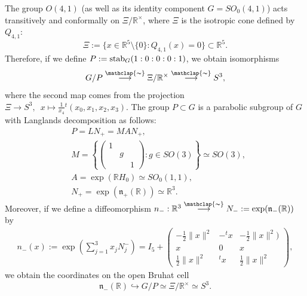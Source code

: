 \documentclass[12pt, pdflatex, a4paper]{article}
\theoremstyle{plain}
\theoremstyle{definition}
\def\n{\mathfrak{n}}
\def\R{{\mathbb R}}
\def\stab{\text{\normalfont{stab}}}
\newcommand\arrowsimeq{\stackrel{\mathclap{\thicksim}}{\longrightarrow}}
\begin{document}
The group $O(4,1)$ (as well as its identity component $G = SO_0(4,1)$) acts transitively and conformally on $\Xi/\R^\times$, where $\Xi$ is the isotropic cone defined by $Q_{4,1}$:
\begin{equation*}
\Xi := \{x \in \R^5\setminus\{0\} : Q_{4,1}(x) = 0\} \subset \R^5.
\end{equation*}
Therefore, if we define $P := \stab_G(1:0:0:0:1)$, we obtain isomorphisms
\begin{equation*}
G/P \arrowsimeq \Xi/\R^\times \arrowsimeq S^3,
\end{equation*}
where the second map comes from the projection $\Xi \rightarrow S^3, \enspace x \mapsto \frac{1}{x_4}{}^t(x_0, x_1, x_2, x_3)$. The group $P \subset G$ is a parabolic subgroup of $G$ with Langlands decomposition as follows:
\begin{align*}
&P = LN_+ = MAN_+,\\
&M = \left\{
\begin{pmatrix}
1 & &\\
& g &\\
& & 1
\end{pmatrix} : g \in SO(3)
\right\} \simeq SO(3),\\
&A = \exp(\R H_0) \simeq SO_0(1,1),\\
&N_+ = \exp(\n_+(\R)) \simeq \R^3.
\end{align*}
Moreover, if we define a diffeomorphism $n_-: \R^3 \arrowsimeq N_- := \exp(\n_-(\R))$ by
\begin{equation}
\label{open-Bruhat-cell}
\begin{gathered}
n_-(x) := \exp\left(\sum_{j = 1}^3 x_jN_j^-\right) =
I_5 +
\begin{pmatrix}
- \frac{1}{2}\|x\|^2 & -{}^tx& -\frac{1}{2}\|x\|^2)\\
x & 0 & x\\
\frac{1}{2}\|x\|^2 & {}^tx & \frac{1}{2}\|x\|^2
\end{pmatrix},
\end{gathered}
\end{equation}
we obtain the coordinates on the open Bruhat cell
\begin{equation*}
\n_-(\R) \hookrightarrow G/P \simeq \Xi/\R^\times \simeq S^3.
\end{equation*}
\end{document}
